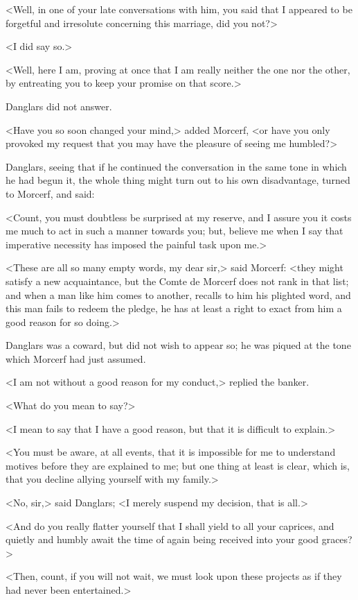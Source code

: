  <Well, in one of your late conversations with him, you said that I appeared to be forgetful and irresolute concerning this marriage, did you not?> 

 <I did say so.> 

 <Well, here I am, proving at once that I am really neither the one nor the other, by entreating you to keep your promise on that score.> 

 Danglars did not answer. 

 <Have you so soon changed your mind,> added Morcerf, <or have you only provoked my request that you may have the pleasure of seeing me humbled?> 

 Danglars, seeing that if he continued the conversation in the same tone in which he had begun it, the whole thing might turn out to his own disadvantage, turned to Morcerf, and said: 

 <Count, you must doubtless be surprised at my reserve, and I assure you it costs me much to act in such a manner towards you; but, believe me when I say that imperative necessity has imposed the painful task upon me.> 

 <These are all so many empty words, my dear sir,> said Morcerf: <they might satisfy a new acquaintance, but the Comte de Morcerf does not rank in that list; and when a man like him comes to another, recalls to him his plighted word, and this man fails to redeem the pledge, he has at least a right to exact from him a good reason for so doing.> 

 Danglars was a coward, but did not wish to appear so; he was piqued at the tone which Morcerf had just assumed. 

 <I am not without a good reason for my conduct,> replied the banker. 

 <What do you mean to say?> 

 <I mean to say that I have a good reason, but that it is difficult to explain.> 

 <You must be aware, at all events, that it is impossible for me to understand motives before they are explained to me; but one thing at least is clear, which is, that you decline allying yourself with my family.> 

 <No, sir,> said Danglars; <I merely suspend my decision, that is all.> 

 <And do you really flatter yourself that I shall yield to all your caprices, and quietly and humbly await the time of again being received into your good graces?> 

 <Then, count, if you will not wait, we must look upon these projects as if they had never been entertained.> 

